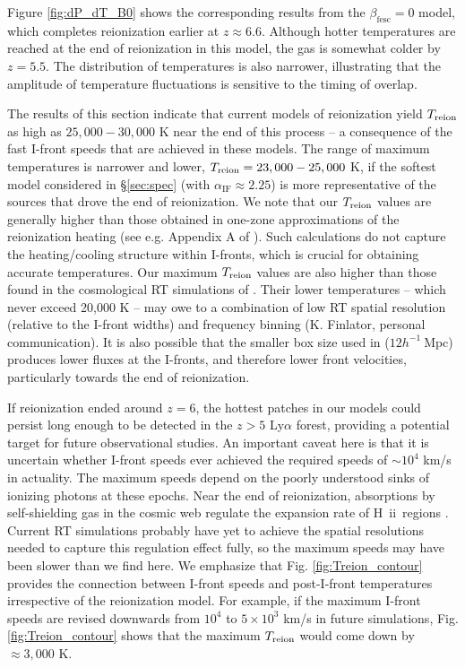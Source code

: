 \documentclass[twocolumn]{aastex62}
\newcommand{\HII}{H{\sc~ii}}
\newcommand{\Treion}{T_{\rm reion}}
\newcommand{\spec}{\alpha_{\mathrm{IF}}}
\newcommand{\Mpc}{\mathrm{Mpc}}
\begin{document}
Figure \ref{fig:dP_dT_B0} shows the corresponding results from the $\beta_{\mathrm{fesc}} = 0$ model, which completes reionization earlier at $z\approx 6.6$. Although hotter temperatures are reached at the end of reionization in this model, the gas is somewhat colder by $z=5.5$.  The distribution of temperatures is also narrower, illustrating that the amplitude of temperature fluctuations is sensitive to the timing of overlap.  

The results of this section indicate that current models of reionization yield $\Treion$ as high as $25,000 - 30,000$ K near the end of this process -- a consequence of the fast I-front speeds that are achieved in these models.  The range of maximum temperatures is narrower and lower, $\Treion = 23,000 - 25,000$ K, if the softest model considered in \S \ref{sec:spec} (with $\spec \approx 2.25$) is more representative of the sources that drove the end of reionization.  We note that our $\Treion$ values are generally higher than those obtained in one-zone approximations of the reionization heating (see e.g. Appendix A of \citealt{2018arXiv180104931P}).  Such calculations do not capture the heating/cooling structure within I-fronts, which is crucial for obtaining accurate temperatures.  Our maximum $\Treion$ values are also higher than those found in the cosmological RT simulations of \citet{2018arXiv180500099F}.  Their lower temperatures -- which never exceed 20,000 K -- may owe to a combination of low RT spatial resolution (relative to the I-front widths) and frequency binning (K. Finlator, personal communication).  It is also possible that the smaller box size used in \citet{2018arXiv180500099F} ($12 h^{-1}~\Mpc$) produces lower fluxes at the I-fronts, and therefore lower front velocities, particularly towards the end of reionization.            

If reionization ended around $z=6$, the hottest patches in our models could persist long enough to be detected in the $z> 5$ Ly$\alpha$ forest, providing a potential target for future observational studies.  An important caveat here is that it is uncertain whether I-front speeds ever achieved the required speeds of $\sim10^4$ km/s in actuality. The maximum speeds depend on the poorly understood sinks of ionizing photons at these epochs.  Near the end of reionization, absorptions by self-shielding gas in the cosmic web regulate the expansion rate of \HII\ regions \citep{2000ApJ...530....1M, 2005MNRAS.363.1031F}.  Current RT simulations probably have yet to achieve the spatial resolutions needed to capture this regulation effect fully, so the maximum speeds may have been slower than we find here.  We emphasize that Fig. \ref{fig:Treion_contour} provides the connection between I-front speeds and post-I-front temperatures irrespective of the reionization model.  For example, if the maximum I-front speeds are revised downwards from $10^{4}$ to $5\times 10^3$ km/s in future simulations, Fig. \ref{fig:Treion_contour} shows that the maximum $\Treion$ would come down by $\approx 3,000$ K.  
\end{document}
